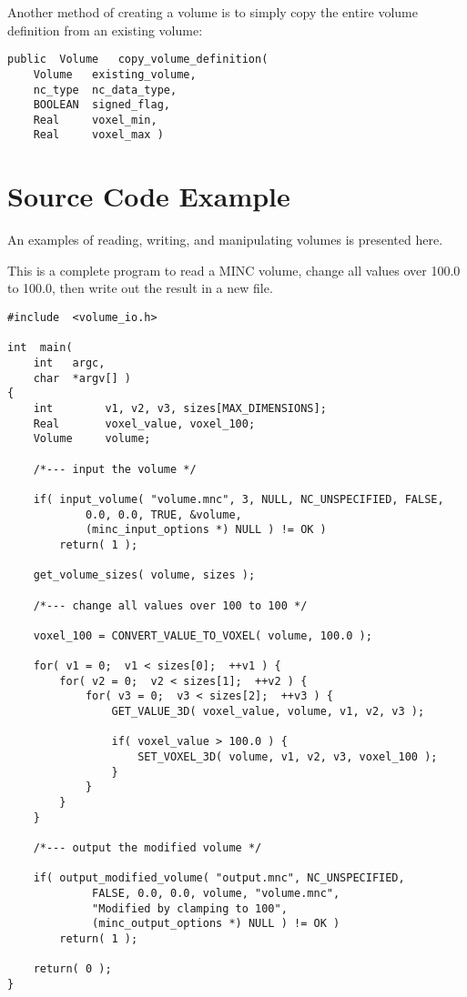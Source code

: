 Another method of creating a volume is to simply copy the entire
volume definition from an existing volume:

{\bf\begin{verbatim}
public  Volume   copy_volume_definition(
    Volume   existing_volume,
    nc_type  nc_data_type,
    BOOLEAN  signed_flag,
    Real     voxel_min,
    Real     voxel_max )
\end{verbatim}}


\section{Source Code Example}

An examples of reading, writing, and manipulating volumes is
presented here.

This is a complete program to read a MINC volume, change all values
over 100.0 to 100.0, then write out the result in a new file.

{\small
\begin{verbatim}
#include  <volume_io.h>

int  main(
    int   argc,
    char  *argv[] )
{
    int        v1, v2, v3, sizes[MAX_DIMENSIONS];
    Real       voxel_value, voxel_100;
    Volume     volume;

    /*--- input the volume */

    if( input_volume( "volume.mnc", 3, NULL, NC_UNSPECIFIED, FALSE,
            0.0, 0.0, TRUE, &volume,
            (minc_input_options *) NULL ) != OK )
        return( 1 );

    get_volume_sizes( volume, sizes );

    /*--- change all values over 100 to 100 */

    voxel_100 = CONVERT_VALUE_TO_VOXEL( volume, 100.0 );

    for( v1 = 0;  v1 < sizes[0];  ++v1 ) {
        for( v2 = 0;  v2 < sizes[1];  ++v2 ) {
            for( v3 = 0;  v3 < sizes[2];  ++v3 ) {
                GET_VALUE_3D( voxel_value, volume, v1, v2, v3 );

                if( voxel_value > 100.0 ) {
                    SET_VOXEL_3D( volume, v1, v2, v3, voxel_100 );
                }
            }
        }
    }

    /*--- output the modified volume */

    if( output_modified_volume( "output.mnc", NC_UNSPECIFIED,
             FALSE, 0.0, 0.0, volume, "volume.mnc",
             "Modified by clamping to 100",
             (minc_output_options *) NULL ) != OK )
        return( 1 );

    return( 0 );
}
\end{verbatim}
}


